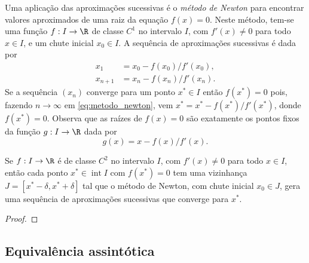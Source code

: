 \documentclass{article}
\begin{document}
Uma aplicação das aproximações sucessivas é o \emph{método de Newton} para encontrar valores aproximados de uma raiz da equação \(f(x)=0\). Neste método, tem-se uma função \(f: I \to \R\) de classe \(C^1\) no intervalo \(I\), com \(f'(x)\neq 0\) para todo \(x \in I\), e um chute inicial \(x_0 \in I\). A sequência de aproximações sucessivas é dada por 
\begin{align}\label{eq:metodo_newton}
    x_1 & = x_0 - f(x_0)/f'(x_0), \\
    x_{n+1} &= x_n - f(x_n)/f'(x_n).
\end{align}
Se a sequência \((x_n)\) converge para um ponto \(x^* \in I\) então \(f(x^*)=0\) pois, fazendo \(n \to \infty\) em \eqref{eq:metodo_newton}, vem \(x^* = x^* - f(x^*)/f'(x^*)\), donde \(f(x^*)=0\). Observa que as raízes de \(f(x)=0\) são exatamente os pontos fixos da função \(g: I \to \R\) dada por
\begin{equation}
    g(x) = x - f(x)/f'(x).
\end{equation}

\begin{prop}
    Se \(f: I \to \R\) é de classe \(C^2\) no intervalo \(I\), com \(f'(x)\neq 0\) para todo \(x \in I\), então cada ponto \(x^* \in \operatorname{int} I\) com \(f(x^*)=0\) tem uma vizinhança \(J = [x^*-\delta, x^*+\delta]\) tal que o método de Newton, com chute inicial \(x_0 \in J\), gera uma sequência de aproximações sucessivas que converge para \(x^*\).
\end{prop}

\begin{proof}
    
\end{proof}

\begin{appendix}

\section{Equivalência assintótica}

\end{appendix}
\end{document}
